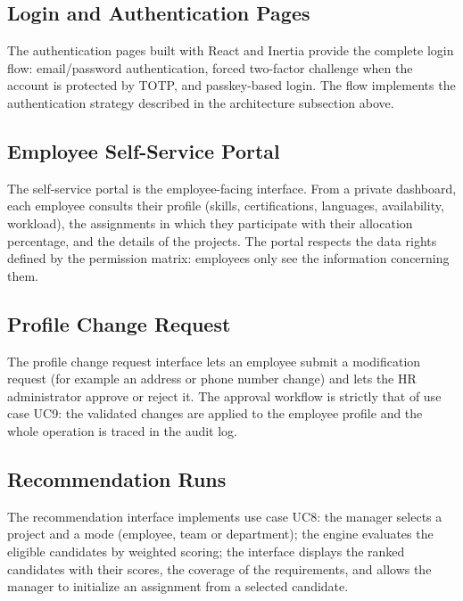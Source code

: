 \documentclass{bts-report}
\begin{document}

\subsection{Login and Authentication Pages}
The authentication pages built with React and Inertia provide the complete login flow: email/password authentication, forced two-factor challenge when the account is protected by TOTP, and passkey-based login. The flow implements the authentication strategy described in the architecture subsection above.


\subsection{Employee Self-Service Portal}
The self-service portal is the employee-facing interface. From a private dashboard, each employee consults their profile (skills, certifications, languages, availability, workload), the assignments in which they participate with their allocation percentage, and the details of the projects. The portal respects the data rights defined by the permission matrix: employees only see the information concerning them.


\subsection{Profile Change Request}
The profile change request interface lets an employee submit a modification request (for example an address or phone number change) and lets the HR administrator approve or reject it. The approval workflow is strictly that of use case UC9: the validated changes are applied to the employee profile and the whole operation is traced in the audit log.


\subsection{Recommendation Runs}
The recommendation interface implements use case UC8: the manager selects a project and a mode (employee, team or department); the engine evaluates the eligible candidates by weighted scoring; the interface displays the ranked candidates with their scores, the coverage of the requirements, and allows the manager to initialize an assignment from a selected candidate.
\end{document}
